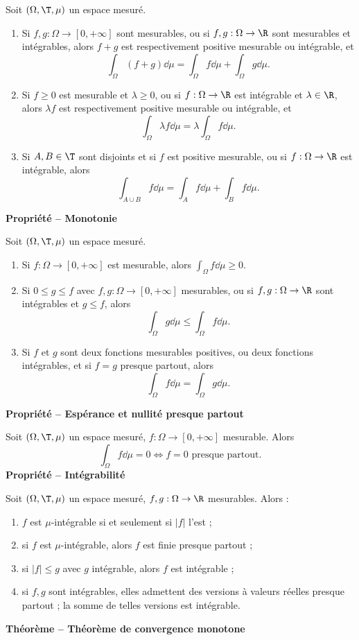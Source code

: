 Soit $(\Omega,\T,\mu)$ un espace mesuré.
\begin{enumerate}
\item Si $f,g:\Omega\to[0,+\infty]$ sont mesurables, ou si $f,g:\Omega\to\R$ sont mesurables et intégrables, alors $f+g$ est respectivement positive mesurable ou intégrable, et
\[\int_\Omega(f+g)\dd\mu=\int_\Omega f\dd\mu+\int_\Omega g\dd\mu.\]
\item Si $f\ge0$ est mesurable et $\lambda\ge0$, ou si $f:\Omega\to\R$ est intégrable et $\lambda\in\R$, alors $\lambda f$ est respectivement positive mesurable ou intégrable, et
\[\int_\Omega\lambda f\dd\mu=\lambda\int_\Omega f\dd\mu.\]
\item Si $A,B\in\T$ sont disjoints et si $f$ est positive mesurable, ou si $f:\Omega\to\R$ est intégrable, alors
\[\int_{A\cup B} f\dd\mu=\int_A f\dd\mu+\int_B f\dd\mu.\]
\end{enumerate}
\textbf{Propriété – Monotonie}

Soit $(\Omega,\T,\mu)$ un espace mesuré.
\begin{enumerate}
\item Si $f:\Omega\to[0,+\infty]$ est mesurable, alors $\int_\Omega f\dd\mu\ge0$.
\item Si $0\le g\le f$ avec $f,g:\Omega\to[0,+\infty]$ mesurables, ou si $f,g:\Omega\to\R$ sont intégrables et $g\le f$, alors
\[\int_\Omega g\dd\mu\le\int_\Omega f\dd\mu.\]
\item Si $f$ et $g$ sont deux fonctions mesurables positives, ou deux fonctions intégrables, et si $f=g$ presque partout, alors
\[\int_\Omega f\dd\mu=\int_\Omega g\dd\mu.\]
\end{enumerate}
\textbf{Propriété – Espérance et nullité presque partout}

Soit $(\Omega,\T,\mu)$ un espace mesuré, $f:\Omega\to[0,+\infty]$ mesurable. Alors
\[\int_\Omega f\dd\mu=0\iff f=0\text{ presque partout}.\]
\textbf{Propriété – Intégrabilité}

Soit $(\Omega,\T,\mu)$ un espace mesuré, $f,g:\Omega\to\R$ mesurables. Alors :
\begin{enumerate}
\item $f$ est $\mu$-intégrable si et seulement si $|f|$ l’est ;
\item si $f$ est $\mu$-intégrable, alors $f$ est finie presque partout ;
\item si $|f|\le g$ avec $g$ intégrable, alors $f$ est intégrable ;
\item si $f,g$ sont intégrables, elles admettent des versions à valeurs réelles presque partout ; la somme de telles versions est intégrable.
\end{enumerate}
\textbf{Théorème – Théorème de convergence monotone}

